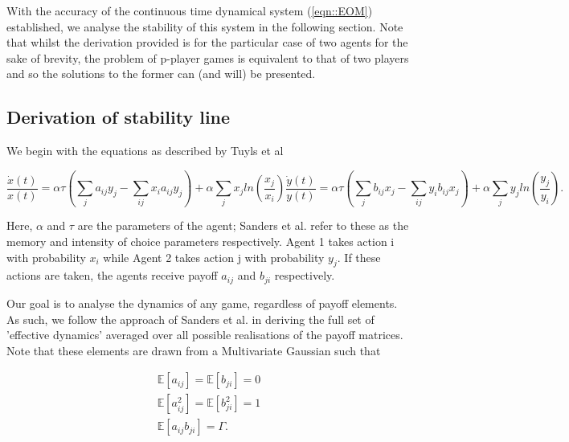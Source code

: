 \documentclass[.../main.tex]{subfiles}
\begin{document}
    With the accuracy of the continuous time dynamical system (\ref{eqn::EOM}) established, we analyse the
    stability of this system in the following section. Note that whilst the derivation provided is
    for the particular case of two agents for the sake of brevity, the problem of p-player games is
    equivalent to that of two players and so the solutions to the former can (and will) be
    presented. 
    
     \subsection{Derivation of stability line} %
     \label{sub:derivation_of_stability_line}
     
     We begin with the equations as described by Tuyls et al \cite{Tuyls2006AnGames}

    \begin{subequations}
    \label{eqn::EOM}
        \begin{equation}
            \frac{\dot{x}(t)}{x(t)} = \alpha \tau (\sum_{j} a_{ij} y_j - \sum_{i j} x_i a_{ij} y_j)
            + \alpha \sum_j x_j ln(\frac{x_j}{x_i}) 
        \end{equation}
        \begin{equation}
            \frac{\dot{y}(t)}{y(t)} = \alpha \tau (\sum_{j} b_{ij} x_j - \sum_{i j} y_i b_{ij} x_j)
            + \alpha \sum_j y_j ln(\frac{y_j}{y_i}).
        \end{equation}
    \end{subequations}

    Here, $\alpha$ and $\tau$ are the parameters of the agent; Sanders et al. refer to these as the memory and intensity of choice parameters respectively. Agent 1 takes action i with probability $x_i$ while Agent 2 takes action j with probability $y_j$. If these actions are taken, the agents receive payoff $a_{ij}$ and $b_{ji}$ respectively. 

    Our goal is to analyse the dynamics of any game, regardless of payoff elements. As such, we
    follow the approach of Sanders et al. in deriving the full set of 'effective dynamics' averaged
    over all possible realisations of the payoff matrices. Note that these elements are drawn from a
    Multivariate Gaussian such that

    \begin{equation*}
        \begin{split}
            \mathbb{E}[a_{ij}] = \mathbb{E}[b_{ji}] = 0\\
            \mathbb{E}[a_{ij}^2] = \mathbb{E}[b_{ji}^2] = 1\\
            \mathbb{E}[a_{ij} b_{ji}] = \Gamma.
        \end{split}
    \end{equation*}
\end{document}
